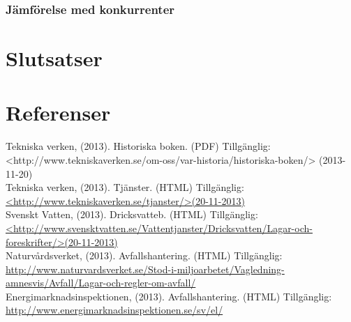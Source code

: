 \documentclass[10pt,a4paper]{article}
\begin{document}
\subsubsection{Jämförelse med konkurrenter}

\section{Slutsatser}

\section{Referenser}
Tekniska verken, (2013). Historiska boken. (PDF) Tillgänglig: \newline
<http://www.tekniskaverken.se/om-oss/var-historia/historiska-boken/> (2013-11-20)\\
Tekniska verken, (2013). Tjänster. (HTML) Tillgänglig: \\
\hyperref{http://www.tekniskaverken.se/tjanster/}{}{}{<http://www.tekniskaverken.se/tjanster/>(20-11-2013)}\\
Svenskt Vatten, (2013). Dricksvatteb. (HTML) Tillgänglig: \\
\hyperref{http://www.svensktvatten.se/Vattentjanster/Dricksvatten/Lagar-och-foreskrifter/}{}{}{<http://www.svensktvatten.se/Vattentjanster/Dricksvatten/Lagar-och-foreskrifter/>(20-11-2013)}\\
Naturvårdsverket, (2013). Avfallshantering. (HTML) Tillgänglig: \\
\hyperref{http://www.naturvardsverket.se/Stod-i-miljoarbetet/Vagledning-amnesvis/Avfall/Lagar-och-regler-om-avfall/}{}{}{http://www.naturvardsverket.se/Stod-i-miljoarbetet/Vagledning-amnesvis/Avfall/Lagar-och-regler-om-avfall/}\\
Energimarknadsinspektionen, (2013). Avfallshantering. (HTML) Tillgänglig: \\
\hyperref{http://www.energimarknadsinspektionen.se/sv/el/}{}{}{http://www.energimarknadsinspektionen.se/sv/el/}\\
\end{document}
